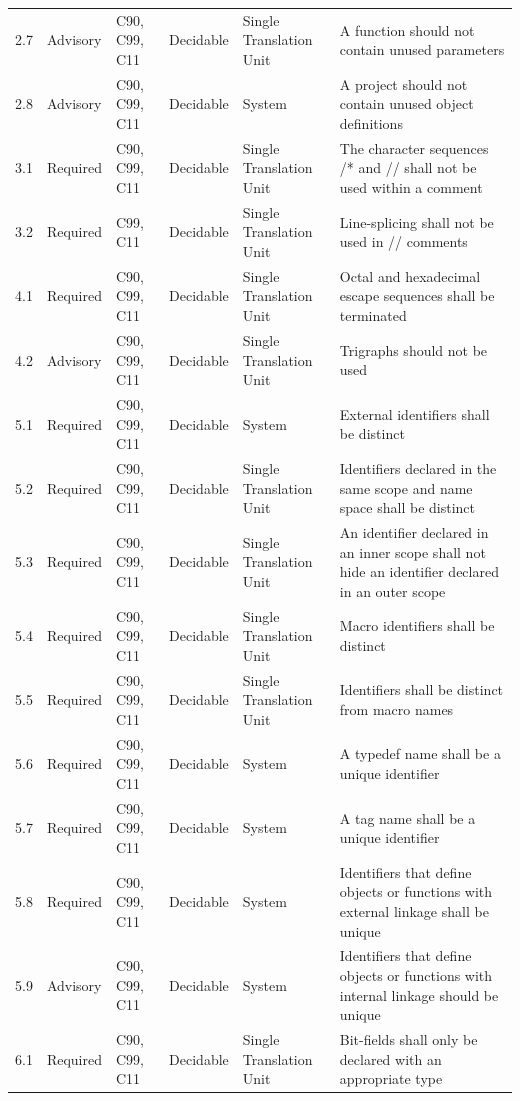 \documentclass[11pt]{article}
\begin{document}
{\begin{longtable}{@{}p{1.0cm}p{1.6cm}p{1.8cm}p{2.0cm}p{1.6cm}p{7.4cm}@{}}
2.7 & Advisory & C90, C99, C11 & Decidable & Single Translation Unit & A function should not contain unused parameters \\
2.8 & Advisory & C90, C99, C11 & Decidable & System & A project should not contain unused object definitions \\
3.1 & Required & C90, C99, C11 & Decidable & Single Translation Unit & The character sequences /* and // shall not be used within a comment \\
3.2 & Required & C99, C11 & Decidable & Single Translation Unit & Line-splicing shall not be used in // comments \\
4.1 & Required & C90, C99, C11 & Decidable & Single Translation Unit & Octal and hexadecimal escape sequences shall be terminated \\
4.2 & Advisory & C90, C99, C11 & Decidable & Single Translation Unit & Trigraphs should not be used \\
5.1 & Required & C90, C99, C11 & Decidable & System & External identifiers shall be distinct \\
5.2 & Required & C90, C99, C11 & Decidable & Single Translation Unit & Identifiers declared in the same scope and name space shall be distinct \\
5.3 & Required & C90, C99, C11 & Decidable & Single Translation Unit & An identifier declared in an inner scope shall not hide an identifier declared in an outer scope \\
5.4 & Required & C90, C99, C11 & Decidable & Single Translation Unit & Macro identifiers shall be distinct \\
5.5 & Required & C90, C99, C11 & Decidable & Single Translation Unit & Identifiers shall be distinct from macro names \\
5.6 & Required & C90, C99, C11 & Decidable & System & A typedef name shall be a unique identifier \\
5.7 & Required & C90, C99, C11 & Decidable & System & A tag name shall be a unique identifier \\
5.8 & Required & C90, C99, C11 & Decidable & System & Identifiers that define objects or functions with external linkage shall be unique \\
5.9 & Advisory & C90, C99, C11 & Decidable & System & Identifiers that define objects or functions with internal linkage should be unique \\
6.1 & Required & C90, C99, C11 & Decidable & Single Translation Unit & Bit-fields shall only be declared with an appropriate type \\

\end{longtable}}
\end{document}
